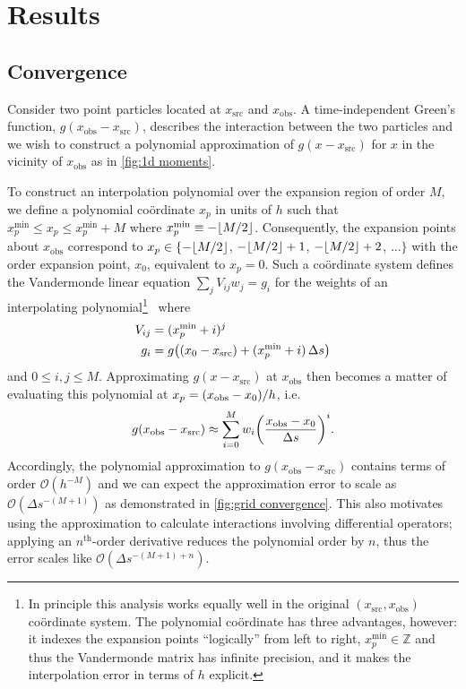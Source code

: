 \section{Results}

\subsection{Convergence}

Consider two point particles located at $x_\text{src}$ and $x_\text{obs}$.
A time-independent Green's function, $g(x_\text{obs} - x_\text{src})$, describes the interaction between the two particles and we wish to construct a polynomial approximation of $g(x - x_\text{src})$ for $x$ in the vicinity of $x_\text{obs}$ as in \cref{fig:1d moments}.

To construct an interpolation polynomial over the expansion region of order $M$, we define a polynomial co\"ordinate $x_p$ in units of $h$ such that $x_p^\text{min} \leqslant x_p \leqslant x_p^\text{min} + M$ where $x_p^\text{min} \equiv -\floor*{M/2}$.
Consequently, the expansion points about $x_\text{obs}$ correspond to $x_p \in \{-\floor*{M/2}$, $-\floor*{M/2} + 1$, $-\floor*{M/2} + 2$, $\ldots\}$ with the  order expansion point, $x_0$, equivalent to $x_p = 0$.
Such a co\"ordinate system defines the Vandermonde linear equation $\sum_{j}V_{ij} w_j = g_i$ for the weights of an interpolating polynomial\footnote{In principle this analysis works equally well in the original $(x_\text{src}, x_\text{obs})$ co\"ordinate system. The polynomial co\"ordinate has three advantages, however: it indexes the expansion points ``logically'' from left to right, $x_p^\text{min} \in \mathbb{Z}$ and thus the Vandermonde matrix has infinite precision, and it makes the interpolation error in terms of $h$ explicit.}~\cite{NumericalRecipes} where
\begin{subequations}
  \begin{align}
    V_{ij} &= (x_p^\text{min} + i)^j \\
    g_i &= g\qty((x_0 - x_\text{src}) + (x_p^\text{min} + i)\, \Delta s)
  \end{align}
\end{subequations}
and $0 \leqslant i, j \leqslant M$.
Approximating $g(x - x_\text{src})$ at $x_\text{obs}$ then becomes a matter of evaluating this polynomial at $x_p = \qty(x_\text{obs} - x_0)/h$, i.e.
\begin{equation}
  g(x_\text{obs} - x_\text{src}) \approx \sum_{i = 0}^{M} w_i \qty(\frac{x_\text{obs} - x_0}{\Delta s})^i.
\end{equation}
Accordingly, the polynomial approximation to $g(x_\text{obs} - x_\text{src})$ contains terms of order $\mathcal{O}(h^{-M})$ and we can expect the approximation error to scale as $\mathcal{O}(\Delta s^{-(M + 1)})$ as demonstrated in \cref{fig:grid convergence}.
This also motivates using the approximation to calculate interactions involving differential operators; applying an $n^\text{th}$-order derivative reduces the polynomial order by $n$, thus the error scales like $\mathcal{O}(\Delta s^{-(M + 1) + n})$.


